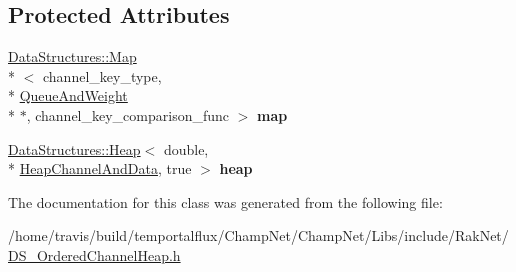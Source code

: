 \subsection*{Protected Attributes}
\begin{DoxyCompactItemize}
\item 
\hypertarget{class_data_structures_1_1_ordered_channel_heap_af858574a5f2f7b6618ae58f0cb4af52d}{\hyperlink{class_data_structures_1_1_map}{Data\-Structures\-::\-Map}\\*
$<$ channel\-\_\-key\-\_\-type, \\*
\hyperlink{struct_data_structures_1_1_ordered_channel_heap_1_1_queue_and_weight}{Queue\-And\-Weight} \\*
$\ast$, channel\-\_\-key\-\_\-comparison\-\_\-func $>$ {\bfseries map}}\label{class_data_structures_1_1_ordered_channel_heap_af858574a5f2f7b6618ae58f0cb4af52d}

\item 
\hypertarget{class_data_structures_1_1_ordered_channel_heap_a71ec113d9527b267cf7f000ff17c330a}{\hyperlink{class_data_structures_1_1_heap}{Data\-Structures\-::\-Heap}$<$ double, \\*
\hyperlink{struct_data_structures_1_1_ordered_channel_heap_1_1_heap_channel_and_data}{Heap\-Channel\-And\-Data}, true $>$ {\bfseries heap}}\label{class_data_structures_1_1_ordered_channel_heap_a71ec113d9527b267cf7f000ff17c330a}

\end{DoxyCompactItemize}


The documentation for this class was generated from the following file\-:\begin{DoxyCompactItemize}
\item 
/home/travis/build/temportalflux/\-Champ\-Net/\-Champ\-Net/\-Libs/include/\-Rak\-Net/\hyperlink{_d_s___ordered_channel_heap_8h}{D\-S\-\_\-\-Ordered\-Channel\-Heap.\-h}\end{DoxyCompactItemize}
